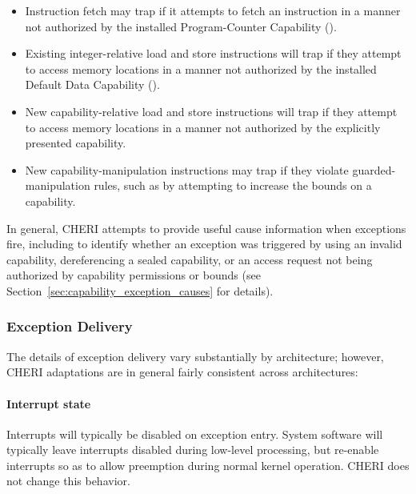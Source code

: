 \begin{itemize}
\item Instruction fetch may trap if it attempts to fetch an instruction in a
  manner not authorized by the installed Program-Counter Capability (\PCC{}).

\item Existing integer-relative load and store instructions will trap if they
  attempt to access memory locations in a manner not authorized by the
  installed Default Data Capability (\DDC{}).

\item New capability-relative load and store instructions will trap if they
  attempt to access memory locations in a manner not authorized by the
  explicitly presented capability.

\item New capability-manipulation instructions may trap if they violate
  guarded-manipulation rules, such as by attempting to increase the bounds on
  a capability.
\end{itemize}

\noindent
In general, CHERI attempts to provide useful cause information when exceptions
fire, including to identify whether an exception was triggered by using an
invalid capability, dereferencing a sealed capability, or an access request
not being authorized by capability permissions or bounds (see
Section~\ref{sec:capability_exception_causes} for details).

\subsubsection{Exception Delivery}

The details of exception delivery vary substantially by architecture; however,
CHERI adaptations are in general fairly consistent across architectures:

\paragraph{Interrupt state}
Interrupts will typically be disabled on exception entry.
System software will typically leave interrupts disabled during low-level
processing, but re-enable interrupts so as to allow preemption during normal
kernel operation.
CHERI does not change this behavior.

